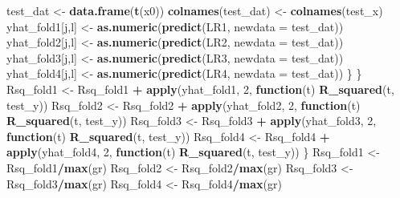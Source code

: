 \documentclass[
]{article}
\newenvironment{Shaded}{\begin{snugshade}}{\end{snugshade}}
\newcommand{\AttributeTok}[1]{\textcolor[rgb]{0.13,0.29,0.53}{#1}}
\newcommand{\ControlFlowTok}[1]{\textcolor[rgb]{0.13,0.29,0.53}{\textbf{#1}}}
\newcommand{\DecValTok}[1]{\textcolor[rgb]{0.00,0.00,0.81}{#1}}
\newcommand{\FunctionTok}[1]{\textcolor[rgb]{0.13,0.29,0.53}{\textbf{#1}}}
\newcommand{\NormalTok}[1]{#1}
\newcommand{\OtherTok}[1]{\textcolor[rgb]{0.56,0.35,0.01}{#1}}
\newcommand{\SpecialCharTok}[1]{\textcolor[rgb]{0.81,0.36,0.00}{\textbf{#1}}}
\begin{document}
\begin{Shaded}
\begin{Highlighting}[]
\NormalTok{        test\_dat }\OtherTok{\textless{}{-}} \FunctionTok{data.frame}\NormalTok{(}\FunctionTok{t}\NormalTok{(x0))}
        \FunctionTok{colnames}\NormalTok{(test\_dat) }\OtherTok{\textless{}{-}} \FunctionTok{colnames}\NormalTok{(test\_x)}
\NormalTok{        yhat\_fold1[j,l] }\OtherTok{\textless{}{-}} \FunctionTok{as.numeric}\NormalTok{(}\FunctionTok{predict}\NormalTok{(LR1, }\AttributeTok{newdata =}\NormalTok{ test\_dat))}
\NormalTok{        yhat\_fold2[j,l] }\OtherTok{\textless{}{-}} \FunctionTok{as.numeric}\NormalTok{(}\FunctionTok{predict}\NormalTok{(LR2, }\AttributeTok{newdata =}\NormalTok{ test\_dat))}
\NormalTok{        yhat\_fold3[j,l] }\OtherTok{\textless{}{-}} \FunctionTok{as.numeric}\NormalTok{(}\FunctionTok{predict}\NormalTok{(LR3, }\AttributeTok{newdata =}\NormalTok{ test\_dat))}
\NormalTok{        yhat\_fold4[j,l] }\OtherTok{\textless{}{-}} \FunctionTok{as.numeric}\NormalTok{(}\FunctionTok{predict}\NormalTok{(LR4, }\AttributeTok{newdata =}\NormalTok{ test\_dat))}
\NormalTok{      \}}
\NormalTok{    \}}
\NormalTok{    Rsq\_fold1 }\OtherTok{\textless{}{-}}\NormalTok{ Rsq\_fold1 }\SpecialCharTok{+} \FunctionTok{apply}\NormalTok{(yhat\_fold1, }\DecValTok{2}\NormalTok{, }\ControlFlowTok{function}\NormalTok{(t) }\FunctionTok{R\_squared}\NormalTok{(t, test\_y))}
\NormalTok{    Rsq\_fold2 }\OtherTok{\textless{}{-}}\NormalTok{ Rsq\_fold2 }\SpecialCharTok{+} \FunctionTok{apply}\NormalTok{(yhat\_fold2, }\DecValTok{2}\NormalTok{, }\ControlFlowTok{function}\NormalTok{(t) }\FunctionTok{R\_squared}\NormalTok{(t, test\_y))}
\NormalTok{    Rsq\_fold3 }\OtherTok{\textless{}{-}}\NormalTok{ Rsq\_fold3 }\SpecialCharTok{+} \FunctionTok{apply}\NormalTok{(yhat\_fold3, }\DecValTok{2}\NormalTok{, }\ControlFlowTok{function}\NormalTok{(t) }\FunctionTok{R\_squared}\NormalTok{(t, test\_y))}
\NormalTok{    Rsq\_fold4 }\OtherTok{\textless{}{-}}\NormalTok{ Rsq\_fold4 }\SpecialCharTok{+} \FunctionTok{apply}\NormalTok{(yhat\_fold4, }\DecValTok{2}\NormalTok{, }\ControlFlowTok{function}\NormalTok{(t) }\FunctionTok{R\_squared}\NormalTok{(t, test\_y))}
\NormalTok{  \}}
\NormalTok{  Rsq\_fold1 }\OtherTok{\textless{}{-}}\NormalTok{ Rsq\_fold1}\SpecialCharTok{/}\FunctionTok{max}\NormalTok{(gr)}
\NormalTok{  Rsq\_fold2 }\OtherTok{\textless{}{-}}\NormalTok{ Rsq\_fold2}\SpecialCharTok{/}\FunctionTok{max}\NormalTok{(gr)}
\NormalTok{  Rsq\_fold3 }\OtherTok{\textless{}{-}}\NormalTok{ Rsq\_fold3}\SpecialCharTok{/}\FunctionTok{max}\NormalTok{(gr)}
\NormalTok{  Rsq\_fold4 }\OtherTok{\textless{}{-}}\NormalTok{ Rsq\_fold4}\SpecialCharTok{/}\FunctionTok{max}\NormalTok{(gr)}
  

\end{Highlighting}
\end{Shaded}
\end{document}
